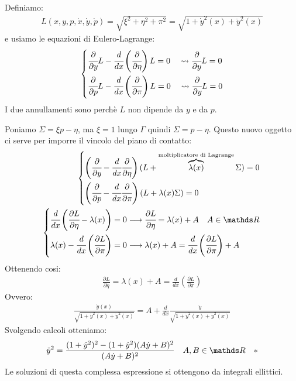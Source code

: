 Definiamo:
\begin{align*}
    L(x,y,p,\dot{x},\dot{y},\dot{p})=\sqrt{\xi^2+\eta^2+\pi^2}=\sqrt{1+\dot{y}^2(x)+\ddot{y}^2(x)}
\end{align*}
e usiamo le equazioni di Eulero-Lagrange:
\begin{align*}
    \begin{cases*}
        \cfrac{\partial}{\partial y}L-\cfrac{d}{dx}\left(\cfrac{\partial}{\partial \eta}\right)L=0 \quad \leadsto \cfrac{\partial}{\partial y}L=0\\
        \cfrac{\partial}{\partial p}L-\cfrac{d}{dx}\left(\cfrac{\partial}{\partial \pi}\right)L=0 \quad \leadsto \cfrac{\partial}{\partial y}L=0
    \end{cases*}
\end{align*}
I due annullamenti sono perchè $L$ non dipende da $y$ e da $p$.

Poniamo $\Sigma=\xi p-\eta$, ma $\xi=1$ lungo $\Gamma$ quindi $\Sigma=p-\eta$.
Questo nuovo oggetto ci serve per imporre il vincolo del piano di contatto:
\begin{align*}
    \begin{cases*}
        \left(\cfrac{\partial}{\partial y}-\cfrac{d}{dx}\cfrac{\partial}{\partial \eta}\right)(L+\overbrace{\lambda(x)}^{\text{moltiplicatore di Lagrange}}\Sigma)=0 \\
        \left(\cfrac{\partial}{\partial p}-\cfrac{d}{dx}\cfrac{\partial}{\partial \pi}\right)(L+\lambda(x)\Sigma)=0 
    \end{cases*}\\
    \begin{cases*}
        \cfrac{d}{dx}\left(\cfrac{\partial L}{\partial \eta}-\lambda(x)\right)=0\longrightarrow \cfrac{\partial L}{\partial \eta}=\lambda(x)+A \quad A\in \R\\
        \lambda(x)-\cfrac{d}{dx}\left(\cfrac{\partial L}{\partial \pi}\right)=0\longrightarrow\lambda(x)+A=\cfrac{d}{dx}\left(\cfrac{\partial L}{\partial \pi}\right)+A
    \end{cases*}
\end{align*}
Ottenendo cosi:
\begin{align*}
    \frac{\partial L}{\partial \eta}=\lambda(x)+A=\frac{d}{dx}\left(\frac{\partial L}{\partial \pi}\right)
\end{align*}
Ovvero:
\begin{align*}
    \frac{\dot{y}(x)}{\sqrt{1+\dot{y}^2(x)+\ddot{y}^2(x)}}=A+\frac{d}{dx}\frac{\ddot{y}}{\sqrt{1+\dot{y}^2(x)+\ddot{y}^2(x)}}
\end{align*}
Svolgendo calcoli otteniamo:
\begin{align*}
    \ddot{y}^2=\frac{(1+\dot{y}^2)^2-(1+\dot{y}^2)(A\dot{y}+B)^2}{(A\dot{y}+B)^2} \quad A,B\in \R \quad *
\end{align*}
Le soluzioni di questa complessa espressione si ottengono da integrali ellittici.

